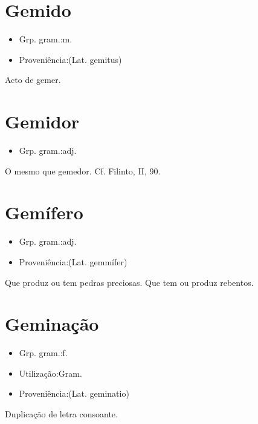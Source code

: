 \section{Gemido}
\begin{itemize}
\item {Grp. gram.:m.}
\end{itemize}
\begin{itemize}
\item {Proveniência:(Lat. \textunderscore gemitus\textunderscore )}
\end{itemize}
Acto de gemer.
\section{Gemidor}
\begin{itemize}
\item {Grp. gram.:adj.}
\end{itemize}
O mesmo que \textunderscore gemedor\textunderscore . Cf. Filinto, II, 90.
\section{Gemífero}
\begin{itemize}
\item {Grp. gram.:adj.}
\end{itemize}
\begin{itemize}
\item {Proveniência:(Lat. \textunderscore gemmífer\textunderscore )}
\end{itemize}
Que produz ou tem pedras preciosas.
Que tem ou produz rebentos.
\section{Geminação}
\begin{itemize}
\item {Grp. gram.:f.}
\end{itemize}
\begin{itemize}
\item {Utilização:Gram.}
\end{itemize}
\begin{itemize}
\item {Proveniência:(Lat. \textunderscore geminatio\textunderscore )}
\end{itemize}
Duplicação de letra consoante.

